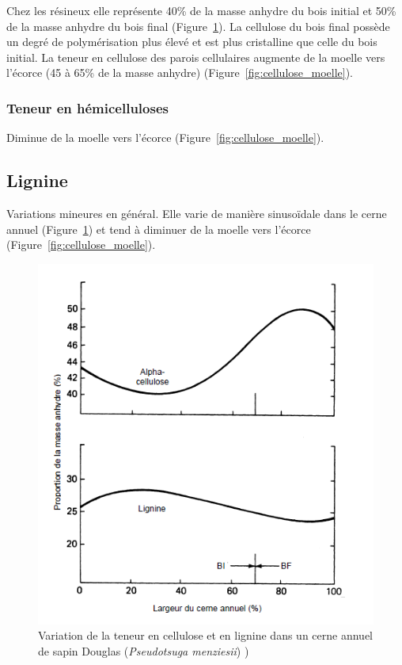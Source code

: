 Chez les résineux elle représente 40\% de la masse anhydre du bois initial et 50\% de la masse anhydre du bois final (Figure~\ref{fig:cellulose_cerne}). La cellulose du bois final possède un degré de polymérisation plus élevé et est plus cristalline que celle du bois initial. La teneur en cellulose des parois cellulaires augmente de la moelle vers l'écorce (45 à 65\% de la masse anhydre) (Figure~\ref{fig:cellulose_moelle}).

\subsubsection{Teneur en hémicelluloses}

Diminue de la moelle vers l'écorce (Figure~\ref{fig:cellulose_moelle}).

\subsection{Lignine}

Variations mineures en général. Elle varie de manière sinusoïdale dans le cerne annuel (Figure~\ref{fig:cellulose_cerne}) et tend à diminuer de la moelle vers l'écorce (Figure~\ref{fig:cellulose_moelle}).

\begin{figure}[h]
	\centering
	\includegraphics[scale=0.7]{img/ch7_cellulose_cerne}
	\caption{Variation de la teneur en cellulose et en lignine dans un cerne annuel de sapin Douglas (\textit{Pseudotsuga menziesii}) \cite{panshin1980textbook})}
	\label{fig:cellulose_cerne}
\end{figure}

